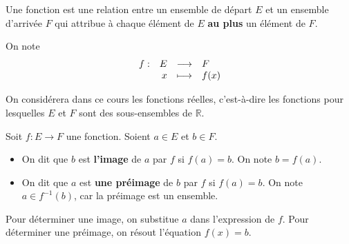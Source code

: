 \documentclass[a4paper,12pt]{report}
\begin{document}
\begin{defi}
	Une fonction est une relation entre un ensemble de départ $E$ et un ensemble d'arrivée $F$ qui attribue à chaque élément de $E$ {\bfseries au plus} un élément de $F$.
\end{defi}
On note
\[\begin{array}[t]{lrcl}
f : & E & \longrightarrow & F \\
    & x & \longmapsto & f(x) 
\end{array}\]

\begin{rem}
	On considérera dans ce cours les fonctions réelles, c'est-à-dire les fonctions pour lesquelles $E$ et $F$ sont des sous-ensembles de $\mathbb{R}$.
\end{rem}
\begin{boiteExT}
\vspace{9cm}
\end{boiteExT}

\begin{defi}
	Soit $f:E\to F$ une fonction. Soient $a\in E$ et $b\in F$.
\begin{itemize}
	\item On dit que $b$ est {\bfseries l'image} de $a$ par $f$ si $f(a)=b$. On note $b=f(a)$.
	\item On dit que $a$ est {\bfseries une préimage} de $b$ par $f$ si $f(a)=b$. On note $a\in f^{-1}(b)$, car la préimage est un ensemble.
\end{itemize}
Pour déterminer une image, on substitue $a$ dans l'expression de $f$. Pour déterminer une préimage, on résout l'équation $f(x)=b$.
\end{defi}
\begin{boiteExT}
\vspace{5cm}
\end{boiteExT}
\newpage
\end{document}
